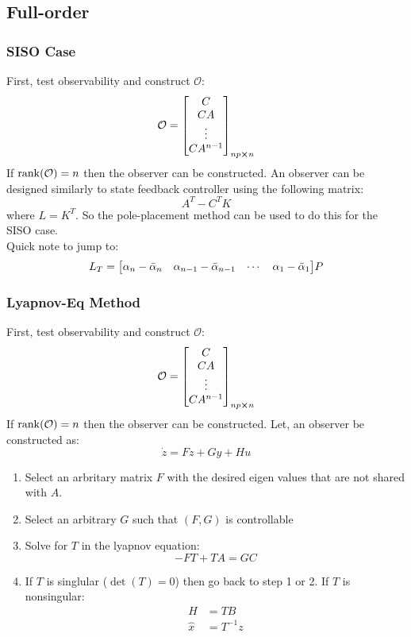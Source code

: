 \documentclass[]{article}
\newcommand{\obsv}{\mathcal{O}}
\begin{document}
	\subsection*{Full-order}
		\subsubsection*{SISO Case}
		First, test observability and construct $\obsv$:
		\begin{displaymath}
			\obsv = \mqty[C\\ CA\\ \vdots\\ C A^{n-1}]_{n p \cross n}
		\end{displaymath}
		If $\rank(\obsv) = n$ then the observer can be constructed.
		An observer can be designed similarly to state feedback controller using the following matrix:
		\begin{displaymath}
			A^T - C^T K
		\end{displaymath}
		where $L=K^T$. So the pole-placement method can be used to do this for the SISO case.\\
		Quick note to jump to:
		\begin{displaymath}
			L_T = \mqty[\alpha_n-\bar{\alpha}_n &\alpha_{n-1}-\bar{\alpha}_{n-1} & \cdots & \alpha_1-\bar{\alpha}_1] P
		\end{displaymath}
		
		\subsubsection*{Lyapnov-Eq Method}
		First, test observability and construct $\obsv$:
		\begin{displaymath}
			\obsv = \mqty[C\\ CA\\ \vdots\\ C A^{n-1}]_{n p \cross n}
		\end{displaymath}
		If $\rank(\obsv) = n$ then the observer can be constructed.
		Let, an observer be constructed as:
		\begin{displaymath}
			\dot{z} = F z + G y + H u
		\end{displaymath}
		\begin{enumerate}
			\item Select an arbritary matrix $F$ with the desired eigen values that are not shared with $A$.
			\item Select an arbitrary $G$ such that $(F,G)$ is controllable
			\item Solve for $T$ in the lyapnov equation:
			\begin{displaymath}
				-F T + T A = G C
			\end{displaymath}
			\item If $T$ is singlular ($\det(T) = 0$) then go back to step 1 or 2. If $T$ is nonsingular:
			\begin{align*}
				H &= T B\\
				\hat{x} &= T^{-1} z
			\end{align*}
		\end{enumerate}
	
\end{document}
